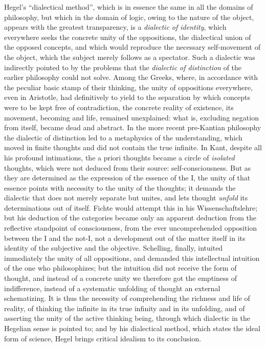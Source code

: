 Hegel's ``dialectical method'', which is in essence the same in all the
domains of philosophy, but which in the domain of logic, owing to the
nature of the object, appears with the greatest transparency, is a
\emph{dialectic of identity}, which everywhere seeks the concrete unity
of the oppositions, the dialectical union of the opposed concepts, and
which would reproduce the necessary self-movement of the object, which
the subject merely follows as a spectator. Such a dialectic was
indirectly pointed to by the problems that the \emph{dialectic of
distinction} of the earlier philosophy could not solve. Among the
Greeks, where, in accordance with the peculiar basic stamp of their
thinking, the unity of oppositions everywhere, even in
Aristotle, had definitively to yield to the separation by which concepts
were to be kept free of contradiction, the concrete reality of
existence, its movement, becoming and life, remained unexplained: what
is, excluding negation from itself, became dead and abstract. In the
more recent pre-Kantian philosophy
the dialectic of distinction led to a metaphysics of the understanding,
which moved in finite thoughts and did not contain the true infinite. In
Kant, despite all his profound intimations, the a priori thoughts became
a circle of \emph{isolated} thoughts, which were not deduced from their
source: self-consciousness. But as they are determined as the
expression of the essence of the I, the unity of that essence points
with necessity to the unity of the thoughts; it demands the dialectic
that does not merely separate but unites, and lets thought
\emph{unfold} its determinations out of itself. Fichte would attempt
this in his Wissenschaftslehre; but his deduction of the categories
became only an apparent deduction from the reflective standpoint of
consciousness, from the ever uncomprehended opposition between the I and
the not-I, not a development out of the matter itself in its identity of
the subjective and the objective. Schelling, finally, intuited
immediately the unity of all oppositions, and demanded this intellectual
intuition of the one who philosophizes; but the intuition did not
receive the form of thought, and instead of a concrete unity we
therefore got the emptiness of indifference, instead of a systematic
unfolding of thought an external schematizing. It is thus the necessity
of comprehending the richness and life of reality, of thinking the
infinite in its true infinity and in its unfolding, and of asserting the
unity of the active thinking being, through which dialectic in the
Hegelian sense is pointed to; and by his dialectical method, which
states the ideal form of science, Hegel brings critical idealism to its
conclusion.


